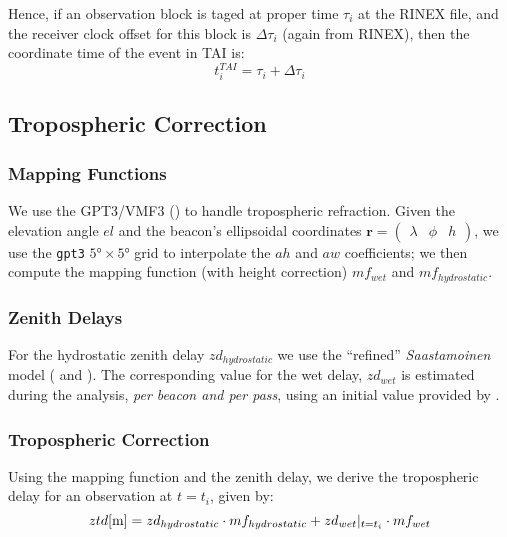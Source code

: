Hence, if an observation block is taged at proper time $\tau _i$ at the RINEX 
file, and the receiver clock offset for this block is $\Delta \tau _i$ (again from 
RINEX), then the coordinate time of the event in TAI is:
\begin{equation}
  t^{TAI}_i = \tau _i + \Delta \tau _i
\end{equation}

\subsection{Tropospheric Correction}
\label{ssec-tropospheric-correction}

\subsubsection{Mapping Functions}
We use the GPT3/VMF3 (\cite{Landskron2018}) to handle tropospheric refraction. 
Given the elevation angle $el$ and the beacon's ellipsoidal coordinates 
$\bm{r}=\begin{pmatrix} \lambda & \phi & h\end{pmatrix}$, we use the \texttt{gpt3} 
$\ang{5} \times \ang{5}$ grid to interpolate the $ah$ and $aw$ coefficients; 
we then compute the mapping function (with height correction) $mf_{wet}$ and 
$mf_{hydrostatic}$.

\subsubsection{Zenith Delays}
For the hydrostatic zenith delay $zd_{hydrostatic}$ we use the ``refined'' 
\emph{Saastamoinen} model (\cite{Davisetal85} and \cite{Saastamoinen72}). 
The corresponding value for the wet delay, $zd_{wet}$ is estimated during the 
analysis, \emph{per beacon and per pass}, using an initial value provided by 
\cite{Askneetal87}.

\subsubsection{Tropospheric Correction}
Using the mapping function and the zenith delay, we derive the tropospheric 
delay for an observation at $t=t_i$, given by:
\begin{equation}
  ztd [\si{\m}] = zd_{hydrostatic} \cdot mf_{hydrostatic} + zd_{wet}\at{t=t_i} \cdot mf_{wet}
  \label{eq:tropo-delay}
\end{equation}

